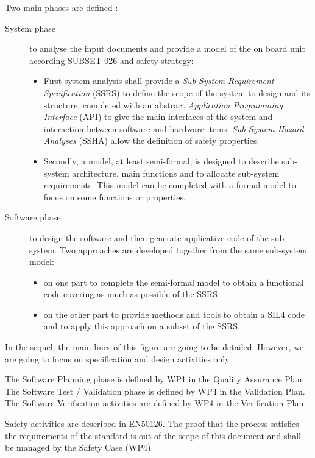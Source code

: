Two main phases are defined :
\begin{description}
\item[System phase] to analyse the input documents and provide a model of the on board unit according SUBSET-026 and safety strategy:
\begin{itemize}
\item First system analysis shall provide a \textit{Sub-System Requirement Specification} (SSRS) to define the scope of the system to  design and its structure, completed with an abstract \textit{Application Programming Interface} (API) to  give the main interfaces of the system and interaction between software and hardware items. \textit{Sub-System Hazard Analyses} (SSHA) allow the definition of safety properties.
\item Secondly, a model, at least semi-formal, is designed to  describe sub-system  architecture, main functions  and to allocate sub-system requirements. This model can be completed with a formal model to focus on some functions or properties.
\end{itemize}
\item[Software phase] to  design the software and then generate applicative code of the sub-system. Two  approaches are developed together from the same sub-system model:
\begin{itemize}
\item on one part to complete the semi-formal model to obtain a functional code covering as much as possible of the SSRS
\item on the other part to provide methods and tools to  obtain a SIL4 code and to apply this approach on a subset of the SSRS.
\end{itemize}
\end{description} 

In the sequel, the main lines of this figure are going to be detailed. However, we are going to focus on specification and design activities only.

The Software Planning phase is defined by WP1 in the Quality Assurance Plan.
The Software Test / Validation phase is defined by WP4 in the Validation Plan.
The Software Verification activities are defined by WP4 in the Verification Plan.

Safety activities are described in EN50126.
The proof that the process satisfies the requirements of the standard is out of the scope of this document and shall be managed by the Safety Case (WP4).



